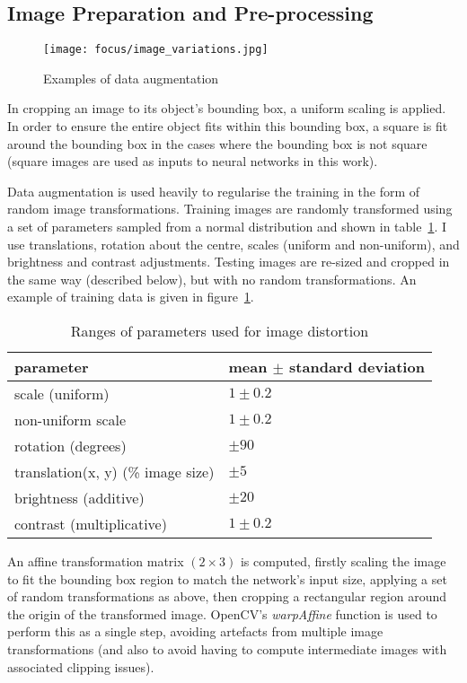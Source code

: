 \subsection {Image Preparation and Pre-processing}


\begin{figure}[t]
    \caption{Examples of data augmentation }
\centering
\texttt{[image: focus/image\_variations.jpg]}
\label{fig:focus_variations}
\end{figure}


In cropping an image to its object's bounding box, a uniform scaling is applied. In order to ensure the entire object fits within this bounding box, a square is fit around the bounding box in the cases where the bounding box is not square (square images are used as inputs to neural networks in this work).

Data augmentation is used heavily to regularise the training in the form of random image transformations. Training images are randomly transformed using a set of parameters sampled from a normal distribution and shown in table~\ref{fig:focus_jitter}.  I use translations, rotation about the centre, scales (uniform and non-uniform), and brightness and contrast adjustments. Testing images are re-sized and cropped in the same way (described below), but with no random transformations. An example of training data is given in figure~\ref{fig:focus_variations}.

\begin{table}[h]
  \centering
    \caption{Ranges of parameters used for image distortion }
    
  \begin{tabular}{ l  l }
    parameter & mean $ \pm $ standard deviation \\
    \toprule
    scale (uniform) & $ 1 \pm 0.2 $  \\ 
    non-uniform scale  & $ 1 \pm 0.2 $  \\ 
    rotation (degrees) & $ \pm 90 $ \\ 
    translation(x, y) (\% image size) & $ \pm 5 $ \\ 
    brightness (additive) & $ \pm 20 $ \\ 
    contrast (multiplicative) & $ 1 \pm 0.2 $ \\ 
    \bottomrule
  \end{tabular}
\label{fig:focus_jitter}
\end{table}


An affine transformation matrix $ (2 \times 3) $ is computed, firstly scaling the image to fit the bounding box region to match the network's input size, applying a set of random transformations as above, then cropping a rectangular region around the origin of the transformed image. OpenCV's \emph{warpAffine} function is used to perform this as a single step, avoiding artefacts from multiple image transformations (and also to avoid having to compute intermediate images with associated clipping issues).

